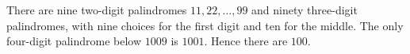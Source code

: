 There are nine two-digit palindromes $ 11,22,\ldots,99 $ and ninety three-digit palindromes, with nine choices for the first digit and ten for the middle. The only four-digit palindrome below $ 1009 $ is $ 1001 $. Hence there are $\boxed{100}$.
